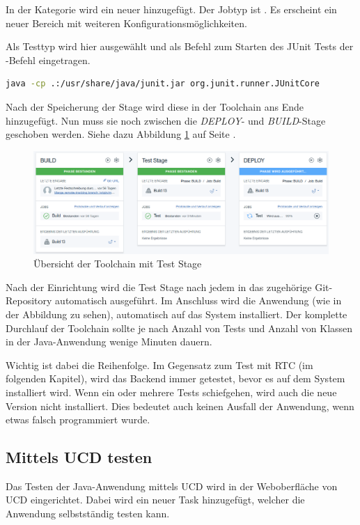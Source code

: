 In der Kategorie  wird ein neuer hinzugefügt. Der Jobtyp ist . Es erscheint ein neuer Bereich mit
weiteren Konfigurationsmöglichkeiten.

Als Testtyp wird hier  ausgewählt und als Befehl zum Starten des JUnit Tests der -Befehl
eingetragen.

\begin{lstlisting}[language=bash, caption=Ausführen von JUnit Tests, label=Ausführen von JUnit Tests]
    java -cp .:/usr/share/java/junit.jar org.junit.runner.JUnitCore
\end{lstlisting}

Nach der Speicherung der Stage wird diese in der Toolchain ans Ende hinzugefügt. Nun muss sie noch zwischen die
\textit{DEPLOY}- und \textit{BUILD}-Stage geschoben werden. Siehe dazu Abbildung \ref{fig:toolchain_teststage} auf Seite
\pageref{fig:toolchain_teststage}.

\begin{figure}[h]
  \centering
    \includegraphics[scale=0.35]{images/kapitel_5/toolchain_teststage.png}
  \caption{Übersicht der Toolchain mit Test Stage}
  \label{fig:toolchain_teststage}
\end{figure}

Nach der Einrichtung wird die Test Stage nach jedem  in das zugehörige Git-Repository automatisch ausgeführt.
Im Anschluss wird die Anwendung (wie in der Abbildung zu sehen), automatisch auf das System installiert. Der komplette
Durchlauf der Toolchain sollte je nach Anzahl von Tests und Anzahl von Klassen in der Java-Anwendung wenige Minuten dauern.

Wichtig ist dabei die Reihenfolge. Im Gegensatz zum Test mit RTC (im folgenden Kapitel), wird das Backend immer getestet,
bevor es auf dem System installiert wird. Wenn ein oder mehrere Tests schiefgehen, wird auch die neue Version nicht
installiert. Dies bedeutet auch keinen Ausfall der Anwendung, wenn etwas falsch programmiert wurde.

\subsection{Mittels UCD testen}
Das Testen der Java-Anwendung mittels UCD wird in der Weboberfläche von UCD eingerichtet. Dabei wird ein neuer Task
hinzugefügt, welcher die Anwendung selbstständig testen kann.

